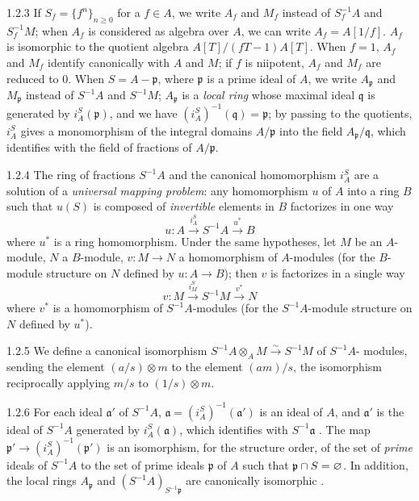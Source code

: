 \begin{env}{1.2.3}
\label{env-0.1.2.3}
If $S_f=\{f^n\}_{n\geq 0}$ for a $f\in A$, we write $A_f$ and $M_f$ instead of $S_f^{-1}A$ and $S_f^{-1}M$; when $A_f$ is
considered as algebra over $A$, we can write $A_f=A[1/f]$. $A_f$ is isomorphic to the quotient algebra $A[T]/(fT-1)A[T]$.
When $f=1$, $A_f$ and $M_f$ identify canonically with $A$ and $M$; if $f$ is niipotent, $A_f$ and $M_f$ are reduced to $0$.
When $S=A-\mathfrak{p}$, where $\mathfrak{p}$ is a prime ideal of $A$, we write $A_\mathfrak{p}$ and $M_\mathfrak{p}$ instead of $S^{-1}A$ and $S^{-1}M$;
$A_\mathfrak{p}$ is a \emph{local ring} whose maximal ideal $\mathfrak{q}$ is generated by $i_A^S(\mathfrak{p})$, and we have
$(i_A^S)^{-1}(\mathfrak{q})=\mathfrak{p}$; by passing to the quotients, $i_A^S$ gives a monomorphism of the integral domains $A/\mathfrak{p}$ into the
field $A_\mathfrak{p}/\mathfrak{q}$, which identifies with the field of fractions of $A/\mathfrak{p}$.
\end{env}

\begin{env}{1.2.4}
\label{env-0.1.2.4}
The ring of fractions $S^{-1}A$ and the canonical homomorphism $i_A^S$ are a solution of a \emph{universal mapping problem}:
any homomorphism $u$ of $A$ into a ring $B$ such that $u(S)$ is composed of \emph{invertible} elements in $B$ factorizes in
one way
\[
  u\colon A\xrightarrow{i_A^S}S^{-1}A\xrightarrow{u^\ast}B
\]
where $u^\ast$ is a ring homomorphism. Under the same hypotheses, let $M$ be an
$A$-module, $N$ a $B$-module, $v\colon M\to N$ a homomorphism of $A$-modules (for the
$B$-module structure on $N$ defined by $u\colon A\to B$); then $v$ is factorizes in a single
way
\[
  v\colon M\xrightarrow{i_M^S}S^{-1}M\xrightarrow{v^\ast}N
\]
where $v^\ast$ is a homomorphism of $S^{-1}A$-modules (for the $S^{-1}A$-module structure 
on $N$ defined by $u^\ast$).
\end{env}

\begin{env}{1.2.5}
\label{env-0.1.2.5}
We define a canonical isomorphism $S^{-1}A\otimes_A M\xrightarrow{\sim}S^{-1}M$ of $S^{-1}A$-
modules, sending the element $(a/s)\otimes m$ to the element $(am)/s$, the isomorphism
reciprocally applying $m/s$ to $(1/s)\otimes m$.
\end{env}

\begin{env}{1.2.6}
\label{env-0.1.2.6}
For each ideal $\mathfrak{a}'$ of $S^{-1}A$, $\mathfrak{a}=(i_A^S)^{-1}(\mathfrak{a}')$ is an ideal of $A$, and $\mathfrak{a}'$
is the ideal of $S^{-1}A$ generated by $i_A^S(\mathfrak{a})$, which identifies with $S^{-1}\mathfrak{a}$ . The map
$\mathfrak{p}'\to(i_A^S)^{-1}(\mathfrak{p}')$ is an isomorphism, for the structure order, of the set of \emph{prime} ideals
of $S^{-1}A$ to the set of prime ideals $\mathfrak{p}$ of $A$ such that $\mathfrak{p}\cap S=\varnothing$. In addition, the local rings
$A_{\mathfrak{p}}$ and $(S^{-1}A)_{S^{-1}\mathfrak{p}}$ are canonically isomorphic .
\end{env}

